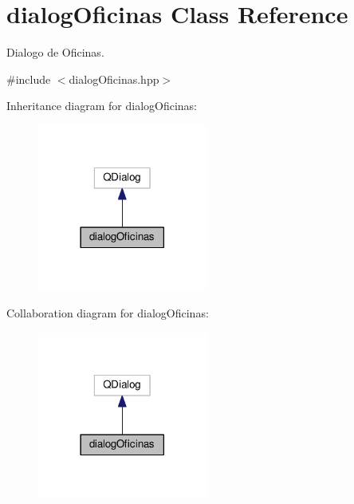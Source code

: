 \hypertarget{classdialogOficinas}{}\section{dialog\+Oficinas Class Reference}
\label{classdialogOficinas}


Dialogo de Oficinas.  




{\ttfamily \#include $<$dialog\+Oficinas.\+hpp$>$}



Inheritance diagram for dialog\+Oficinas\+:
\nopagebreak
\begin{figure}[H]
\begin{center}
\leavevmode
\includegraphics[width=158pt]{classdialogOficinas__inherit__graph}
\end{center}
\end{figure}


Collaboration diagram for dialog\+Oficinas\+:
\nopagebreak
\begin{figure}[H]
\begin{center}
\leavevmode
\includegraphics[width=158pt]{classdialogOficinas__coll__graph}
\end{center}
\end{figure}
